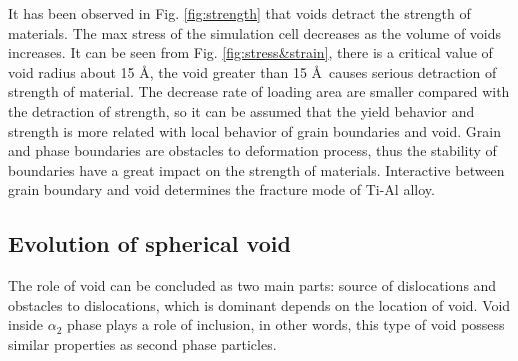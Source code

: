 \documentclass[materials,article,submit,moreauthors,pdftex,10pt,a4paper]{Definitions/mdpi}
\begin{document}

It has been observed in Fig. \ref{fig:strength} that voids detract the strength of  materials. The max stress  of the simulation cell decreases as the volume of voids increases. It can be seen from Fig. \ref{fig:stress&strain}, there is a critical value of void radius about 15 \AA, the void greater than 15 \AA\ causes serious detraction of strength of material.  The decrease rate of loading area are smaller compared  with the detraction of strength, so it can be assumed that the  yield behavior and strength is more related with local behavior of grain boundaries and void. Grain and phase boundaries are obstacles to deformation process, thus the stability of boundaries have a great impact on the strength of materials. Interactive between grain boundary and void determines the fracture mode of   Ti-Al alloy.




\subsection{Evolution of spherical void}
The role of void can be concluded as two main parts: source of dislocations and obstacles to dislocations, which is dominant depends on the location of void. Void inside $\alpha_2$ phase plays a role of inclusion, in other words, this type of void possess similar properties as second phase particles.
\end{document}

